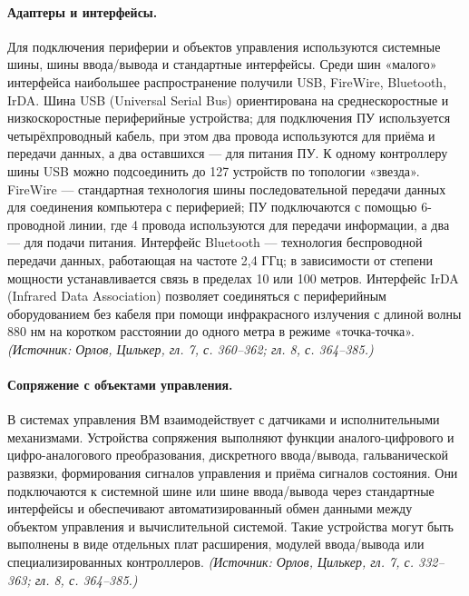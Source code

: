 \documentclass[a4paper,12pt]{article}
\begin{document}
\paragraph{Адаптеры и интерфейсы.}
Для подключения периферии и объектов управления используются системные шины, шины ввода/вывода и стандартные интерфейсы. Среди шин «малого» интерфейса наибольшее распространение получили USB, FireWire, Bluetooth, IrDA. Шина USB (Universal Serial Bus) ориентирована на среднескоростные и низкоскоростные периферийные устройства; для подключения ПУ используется четырёхпроводный кабель, при этом два провода используются для приёма и передачи данных, а два оставшихся — для питания ПУ. К одному контроллеру шины USB можно подсоединить до 127 устройств по топологии «звезда». FireWire — стандартная технология шины последовательной передачи данных для соединения компьютера с периферией; ПУ подключаются с помощью 6-проводной линии, где 4 провода используются для передачи информации, а два — для подачи питания. Интерфейс Bluetooth — технология беспроводной передачи данных, работающая на частоте 2,4 ГГц; в зависимости от степени мощности устанавливается связь в пределах 10 или 100 метров. Интерфейс IrDA (Infrared Data Association) позволяет соединяться с периферийным оборудованием без кабеля при помощи инфракрасного излучения с длиной волны 880 нм на коротком расстоянии до одного метра в режиме «точка-точка».
\textit{(Источник: Орлов, Цилькер, гл. 7, с. 360--362; гл. 8, с. 364--385.)}

\paragraph{Сопряжение с объектами управления.}
В системах управления ВМ взаимодействует с датчиками и исполнительными механизмами. Устройства сопряжения выполняют функции аналого-цифрового и цифро-аналогового преобразования, дискретного ввода/вывода, гальванической развязки, формирования сигналов управления и приёма сигналов состояния. Они подключаются к системной шине или шине ввода/вывода через стандартные интерфейсы и обеспечивают автоматизированный обмен данными между объектом управления и вычислительной системой. Такие устройства могут быть выполнены в виде отдельных плат расширения, модулей ввода/вывода или специализированных контроллеров.
\textit{(Источник: Орлов, Цилькер, гл. 7, с. 332--363; гл. 8, с. 364--385.)}
\end{document}
